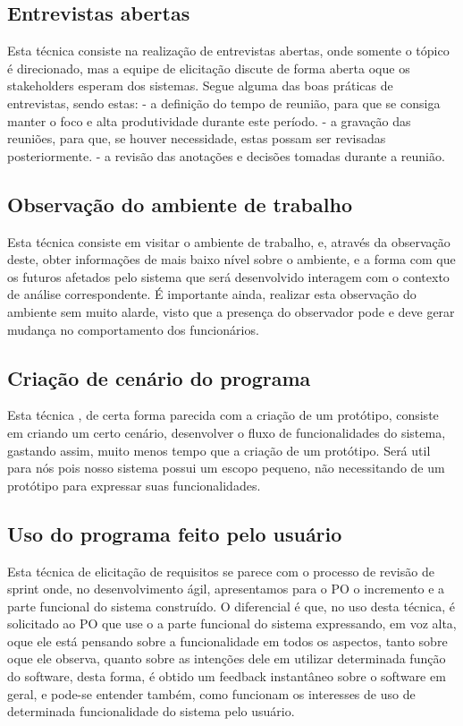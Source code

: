   \subsection{Entrevistas abertas}
  
  Esta técnica consiste na realização de entrevistas abertas, onde somente o tópico é direcionado, mas a equipe de elicitação
  discute de forma aberta oque os stakeholders esperam dos sistemas. Segue alguma das boas práticas de entrevistas, sendo estas:
  - a definição do tempo de reunião, para que se consiga manter o foco
  e alta produtividade durante este período.
   - a gravação das reuniões, para que, se houver necessidade, estas possam ser revisadas posteriormente.
  - a revisão das anotações e decisões tomadas durante a reunião.
  
  \subsection{Observação do ambiente de trabalho}
  
  Esta técnica consiste em visitar o ambiente de trabalho, e, através da observação deste, obter informações de
  mais baixo nível sobre o ambiente, e a forma com que os futuros afetados pelo sistema que será desenvolvido interagem
  com o contexto de análise correspondente. É importante ainda, realizar esta observação do ambiente sem muito alarde,
  visto que a presença do observador pode e deve gerar mudança no comportamento dos funcionários.
  
  \subsection{Criação de cenário do programa}
  
  Esta técnica , de certa forma parecida com  a criação de um protótipo, consiste em criando um certo cenário,
  desenvolver o fluxo de funcionalidades do sistema, gastando assim, muito menos tempo que a criação de um protótipo.
  Será util para nós pois nosso sistema possui um escopo pequeno, não necessitando de um protótipo para expressar 
  suas funcionalidades.
  
  \subsection{Uso do programa feito pelo usuário}
  
  Esta técnica de elicitação de requisitos se parece com o processo de revisão de sprint
  onde, no desenvolvimento ágil, apresentamos para o PO o incremento e a parte funcional do sistema construído.
  O diferencial é que, no uso desta técnica, é solicitado ao PO que use o a parte funcional do sistema expressando, 
  em voz alta, oque ele está pensando sobre a funcionalidade em todos os aspectos, tanto sobre oque ele observa, quanto
  sobre as intenções dele em utilizar determinada função do software, desta forma, é obtido um feedback
  instantâneo sobre o software em geral, e pode-se entender também, 
  como funcionam os interesses de uso de determinada funcionalidade
  do sistema pelo usuário.
